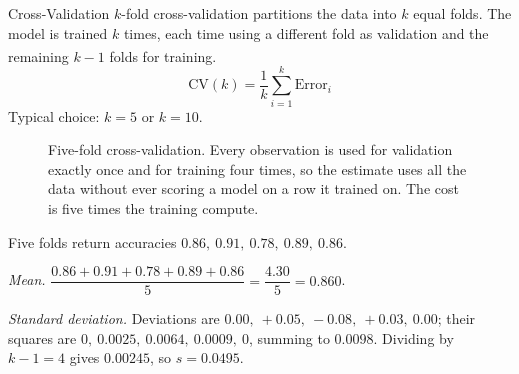 \begin{v3topic}{Cross-Validation}
    $k$-fold cross-validation partitions the data into $k$ equal folds.
    The model is trained $k$ times, each time using a different fold as validation and the remaining $k{-}1$ folds for training\textsuperscript{\cite[][pp.~20--22]{iiiCourseMachineLearning}}.
\visualseparator
    \begin{equation}
        \text{CV}(k) = \frac{1}{k}\sum_{i=1}^{k} \text{Error}_i
        \label{eq:ml-cv}
    \end{equation}
    Typical choice: $k = 5$ or $k = 10$.

\begin{figure}[htbp]
\centering
{}
\caption{Five-fold cross-validation. Every observation is used for validation
exactly once and for training four times, so the estimate uses all the data
without ever scoring a model on a row it trained on. The cost is five times the
training compute.}
\label{fig:ml-cross-validation}
\end{figure}

\begin{workedexample}
Five folds return accuracies $0.86,\ 0.91,\ 0.78,\ 0.89,\ 0.86$.

\emph{Mean.} $\dfrac{0.86+0.91+0.78+0.89+0.86}{5} = \dfrac{4.30}{5} = 0.860$.

\emph{Standard deviation.} Deviations are
$0.00,\ +0.05,\ -0.08,\ +0.03,\ 0.00$; their squares are
$0,\ 0.0025,\ 0.0064,\ 0.0009,\ 0$, summing to $0.0098$. Dividing by
$k-1 = 4$ gives $0.00245$, so $s = 0.0495$.


\end{workedexample}
\end{v3topic}
